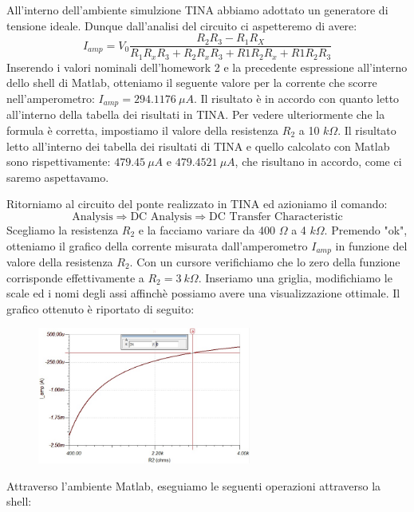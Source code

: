 All'interno dell'ambiente simulzione TINA abbiamo adottato un generatore di tensione ideale. Dunque dall'analisi del circuito ci aspetteremo di avere:
\begin{equation}
    I_{amp} = V_0\frac{R_2 R_3 - R_1 R_X}{R_1 R_x R_3 + R_2 R_x R_3 + R1 R_2 R_x + R1 R_2 R_3}
    \label{eq::ponte}
\end{equation}
Inserendo i valori nominali dell'homework 2 e la precedente espressione all'interno dello shell di Matlab, otteniamo il seguente valore per la corrente che scorre nell'amperometro: $I_{amp} = 294.1176 \: \mu A $. Il risultato è in accordo con quanto letto all'interno della tabella dei risultati in TINA.
Per vedere ulteriormente che la formula è corretta, impostiamo il valore della resistenza $R_2$ a 10 $k\Omega$. Il risultato letto all'interno dei tabella dei risultati di TINA e quello calcolato con Matlab sono rispettivamente: $479.45 \: \mu A$ e $479.4521 \: \mu A$, che risultano in accordo, come ci saremo aspettavamo.

Ritorniamo al circuito del ponte realizzato in TINA ed azioniamo il comando:
\begin{equation}
    \text{Analysis} \Rightarrow \text{DC Analysis} \Rightarrow \text{DC Transfer Characteristic}
\end{equation}
Scegliamo la resistenza $R_2$ e la facciamo variare da 400 $\Omega$ a 4 $k\Omega$. Premendo "ok", otteniamo il grafico della corrente misurata dall'amperometro $I_{amp}$ in funzione del valore della resistenza $R_2$. Con un cursore verifichiamo che lo zero della funzione corrisponde effettivamente a $R_2 = 3 \: k\Omega$. Inseriamo una griglia, modifichiamo le scale ed i nomi degli assi affinchè possiamo avere una visualizzazione ottimale. Il grafico ottenuto è riportato di seguito:

\begin{figure}[H]
\caption{}
    \includegraphics[width=7cm]{settimana_2/immagini/diagramma_r2.jpg}
    \centering
\end{figure}

Attraverso l'ambiente Matlab, eseguiamo le seguenti operazioni attraverso la shell:

